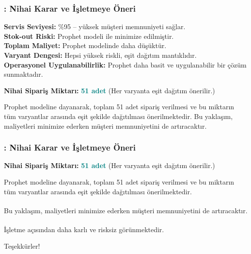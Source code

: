 \documentclass[12pt]{beamer}
\begin{document}
	\begin{frame}
		\frametitle{\insertsection: Nihai Karar ve İşletmeye Öneri}
		
		\textbf{Servis Seviyesi:} \%95 – yüksek müşteri memnuniyeti sağlar. \\
		\textbf{Stok-out Riski:} Prophet modeli ile minimize edilmiştir. \\
		\textbf{Toplam Maliyet:} Prophet modelinde daha düşüktür. \\
		\textbf{Varyant Dengesi:} Hepsi yüksek riskli, eşit dağıtım
		mantıklıdır. \\
		\textbf{Operasyonel Uygulanabilirlik:} Prophet daha basit ve
		uygulanabilir bir çözüm sunmaktadır.
		
		\vspace{0.5cm}
		\textbf{Nihai Sipariş Miktarı:} \textcolor{teal}{\textbf{51 adet}}
		(Her varyanta eşit dağıtım önerilir.)
		
		\vspace{0.4cm}
		\begin{tcolorbox}
			Prophet modeline dayanarak, toplam 51 adet sipariş verilmesi ve
			bu miktarın tüm varyantlar arasında eşit şekilde dağıtılması önerilmektedir. Bu
			yaklaşım, maliyetleri minimize ederken müşteri memnuniyetini de artıracaktır.
		\end{tcolorbox}
	\end{frame}
	
	\begin{frame}
		\frametitle{\insertsection: Nihai Karar ve İşletmeye Öneri}
		\textbf{Nihai Sipariş Miktarı:} \textcolor{teal}{\textbf{51 adet}}
		(Her varyanta eşit dağıtım önerilir.)
		
		\vspace{0.4cm}
		\begin{tcolorbox}
			Prophet modeline dayanarak, toplam 51 adet sipariş verilmesi ve
			bu miktarın tüm varyantlar arasında eşit şekilde dağıtılması önerilmektedir.
			\\~\\
			Bu yaklaşım, maliyetleri minimize ederken müşteri memnuniyetini
			de artıracaktır.
			\\~\\
			İşletme açısından daha karlı ve risksiz görünmektedir.
		\end{tcolorbox}
		
	\end{frame}
	
	\begin{frame}
		\centering
		\Huge Teşekkürler!
	\end{frame}
	
\end{document}
